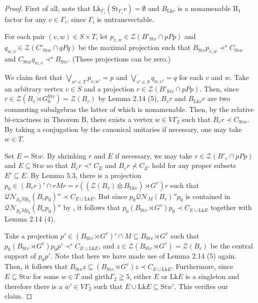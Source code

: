 \documentclass{amsart}
\theoremstyle{definition}
\renewcommand{\subset}{\subseteq}
\newcommand{\twoone}{$\mathrm{II}_1$\xspace}
\newcommand{\barotimes}{\overline{\otimes}}
\begin{document}
\begin{proof}
First of all, note that $\mathrm{Lk}_{\Gamma_i}(\mathrm{St}_{\Gamma_i}v)=\emptyset$ 
and $B_{\mathrm{Lk}v}$ is a nonamenable \twoone factor 
for any $v\in\Gamma_i$, since $\Gamma_i$ is untransvectable. 

For each pair $(v,w)\in S\times T$, 
let $p_{v,w}\in \mathcal{Z}(B'_{\mathrm{St}v}\cap pPp)$ and $q_{w,v}\in \mathcal{Z}(C'_{\mathrm{St}w}\cap qPq)$ be the maximal projection 
such that $B_{\mathrm{St}v}p_{v,w}\prec^s C_{\mathrm{St}w}$ and 
$C_{\mathrm{St}w}q_{w,v}\prec^s B_{\mathrm{St}v}$. 
(These projections can be zero.)

We claim first that $\bigvee_{w'\in T} p_{v,w'}=p$ and $\bigvee_{v'\in S} q_{w,v'}=q$
for each $v$ and $w$. 
Take an arbitrary vertex $v\in S$ 
and a projection $r\in \mathcal{Z}(B'_{\mathrm{St}v}\cap pPp)$. 
Then, since $r\in\mathcal{Z}(B_v\rtimes G_0^{\mathrm{St}v})=\mathcal{Z}(B_v)$ by Lemma 2.14 (5), 
$B_vr$ and $B_{\mathrm{Lk}v}r$ are two commuting subalgebras the latter of which is nonamenable. 
Then, by the relative bi-exactness in Theorem B, 
there exists a vertex $w\in V\Gamma_2$ such that $B_{v}r\prec C_{\mathrm{St}w}$. 
By taking a conjugation by the canonical unitaries if necessary, one may take $w\in T$. 

Set $E=\mathrm{St}w$. By shrinking $r$ and $E$ if necessary, 
we may take $r\in \mathcal{Z}(B'_v\cap pPp)$ and $E\subset \mathrm{St}w$ so that $B_vr\prec^s C_E$ and $B_vr\nprec C_{E'}$ hold
for any proper subsets $E'\subset E$. 
By Lemma 5.3, there is a projection $p_0\in (B_vr)'\cap rMr= r((\mathcal{Z}(B_v)\barotimes B_{\mathrm{Lk}v})\rtimes G^v)r$ such that
$\mathcal{QN}_{p_0Mp_0}(B_vp_0)''\prec C_{E\cup \mathrm{Lk}E}$. 
But since $p_0\mathcal{QN}_M(B_v)''p_0$ is contained in $\mathcal{QN}_{p_0Mp_0}(B_vp_0)''$
by \cite[Lemma 3.5]{pop1}, it follows that 
$p_0(B_{\mathrm{St}v}\rtimes G^v)p_0\prec C_{E\cup \mathrm{Lk}E}$
together with Lemma 2.14 (4). 

Take a projection $p'\in (B_{\mathrm{St}v}\rtimes G^v)'\cap M\subset B_{\mathrm{St}v}\rtimes G^v$
such that $p_0(B_{\mathrm{St}v}\rtimes G^v)p_0p'\prec^s C_{E\cup \mathrm{Lk}E}$, 
and $z\in \mathcal{Z}(B_{\mathrm{St}v}\rtimes G^v)=\mathcal{Z}(B_v)$ be the central support of $p_0p'$. 
Note that here we have made use of Lemma 2.14 (5) again. 
Then, it follows that 
$B_{\mathrm{St}v}z\subset (B_{\mathrm{St}v}\rtimes G^v)z\prec C_{E\cup \mathrm{Lk}E}$. 
Furthermore, since $E\subset \mathrm{St}w$ for some $w\in T$ and $\mathrm{girth}\Gamma_2 \geqq 5$, either $E$ or $\mathrm{Lk}E$ is a singleton and 
therefore there is a $w'\in V\Gamma_2$ such that $E\cup \mathrm{Lk}E\subset \mathrm{St}w'$. 
This verifies our claim. 


\end{proof}
\end{document}
